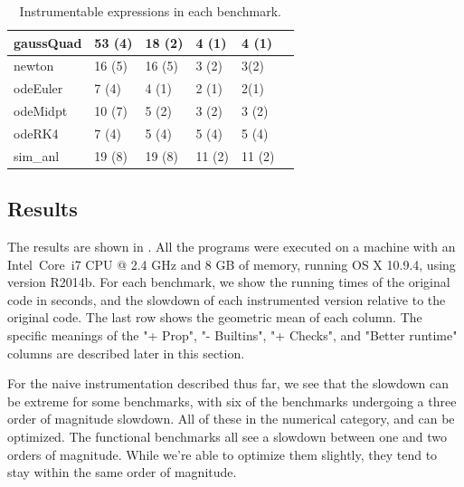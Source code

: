 \begin{table}
\begin{tabular}{| l | l | l | l | l | l |}
  gaussQuad   & 53 (4) & 18 (2) & 4 (1) & 4 (1) \\ \hline
  newton      & 16 (5) & 16 (5) & 3 (2) & 3(2) \\ \hline
  odeEuler    & 7 (4) & 4 (1) & 2 (1) & 2(1) \\\hline
  odeMidpt    & 10 (7) & 5 (2) & 3 (2) & 3 (2) \\ \hline
  odeRK4      & 7 (4) & 5 (4) & 5 (4) & 5 (4) \\ \hline
  sim\_anl    & 19 (8) & 19 (8) & 11 (2) & 11 (2) \\ \hline
\end{tabular}
\caption{Instrumentable expressions in each benchmark.}
\label{tab:InstrumentationBenchmarksInstrumentable}
\end{table}

\subsection{Results}

The results are shown in . All the
programs were executed on a machine with an Intel\textregistered \,
Core\texttrademark \, i7 CPU @ 2.4 GHz and 8 GB of memory, running OS X 10.9.4,
using \matlab version R2014b. For each benchmark, we show the running times of
the original code in seconds, and the slowdown of each instrumented version
relative to the original code. The last row shows the geometric mean of each
column. The specific meanings of the "+ Prop", "- Builtins", "+ Checks", and
"Better runtime" columns are described later in this section.

For the naive instrumentation described thus far, we see that the slowdown can
be extreme for some benchmarks, with six of the benchmarks undergoing a three
order of magnitude slowdown. All of these in the numerical category, and can be
optimized. The functional benchmarks all see a slowdown between one and two
orders of magnitude. While we're able to optimize them slightly, they tend to
stay within the same order of magnitude.


